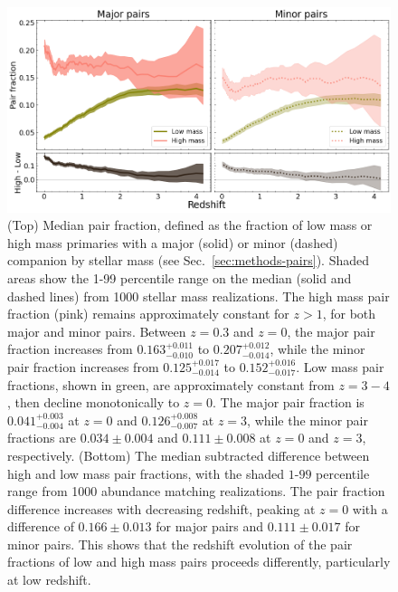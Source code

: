 \documentclass[twocolumn]{aastex631}
\begin{document}
    \label{sec:results}
    \begin{figure}[htp]
      \centering
      \includegraphics[width=\textwidth]{pairfrac_1000.png}
      \caption{%
        (Top) Median pair fraction, defined as the fraction of low mass or high mass primaries with a major (solid) or minor (dashed) companion by stellar mass (see Sec.~\ref{sec:methods-pairs}). 
        Shaded areas show the 1-99 percentile range on the median (solid and dashed lines) from 1000 stellar mass realizations. 
        The high mass pair fraction (pink) remains approximately constant for $z>1$, for both major and minor pairs. 
        Between $z=0.3$ and $z=0$, the major pair fraction increases from $0.163^{+0.011}_{-0.010}$ to $0.207^{+0.012}_{-0.014}$, while the minor pair fraction increases from $0.125^{+0.017}_{-0.014}$ to $0.152^{+0.016}_{-0.017}$.
        Low mass pair fractions, shown in green, are approximately constant from $z=3-4$, then decline monotonically to $z=0$. The major pair fraction is $0.041^{+0.003}_{-0.004}$ at $z=0$ and $0.126^{+0.008}_{-0.007}$ at $z=3$, while the minor pair fractions are $0.034\pm0.004$ and $0.111\pm0.008$ at $z=0$ and $z=3$, respectively. 
        (Bottom) The median subtracted difference between high and low mass pair fractions, with the shaded $1$-$99$ percentile range from 1000 abundance matching realizations. The pair fraction difference increases with decreasing redshift, peaking at $z=0$ with a difference of $0.166\pm0.013$ for major pairs and $0.111\pm0.017$ for minor pairs. This shows that the redshift evolution of the pair fractions of low and high mass pairs proceeds differently, particularly at low redshift.}
      \label{fig:pairfrac}
    \end{figure}
\end{document}
